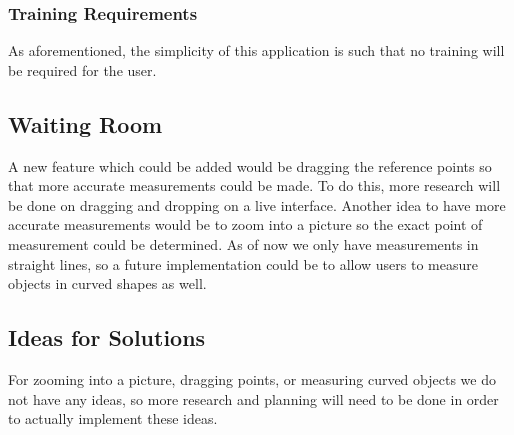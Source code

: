 \documentclass[12pt, titlepage]{article}
\begin{document}
\subsubsection{Training Requirements}
As aforementioned, the simplicity of this application is such that no training will be required for the user.

\subsection{Waiting Room}
A new feature which could be added would be dragging the reference points so that more accurate measurements could be made. To do this, more research will be done on dragging and dropping on a live interface. Another idea to have more accurate measurements would be to zoom into a picture so the exact point of measurement could be determined. As of now we only have measurements in straight lines, so a future implementation could be to allow users to measure objects in curved shapes as well. 

\subsection{Ideas for Solutions}
For zooming into a picture, dragging points, or measuring curved objects we do not have any ideas, so more research and planning will need to be done in order to actually implement these ideas. 
\end{document}

